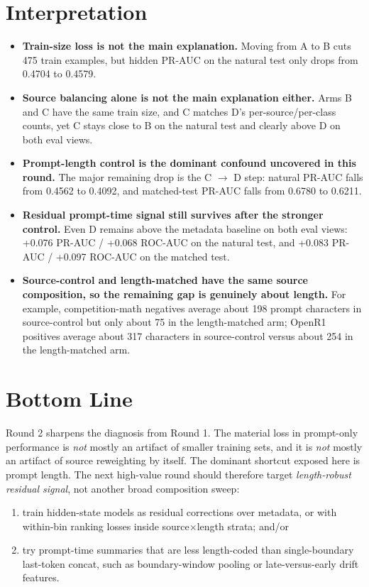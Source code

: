 \documentclass[11pt]{article}
\begin{document}
\section*{Interpretation}
\begin{itemize}
  \item \textbf{Train-size loss is not the main explanation.} Moving from A to B cuts 475 train examples, but hidden PR-AUC on the natural test only drops from 0.4704 to 0.4579.
  \item \textbf{Source balancing alone is not the main explanation either.} Arms B and C have the same train size, and C matches D's per-source/per-class counts, yet C stays close to B on the natural test and clearly above D on both eval views.
  \item \textbf{Prompt-length control is the dominant confound uncovered in this round.} The major remaining drop is the C $\rightarrow$ D step: natural PR-AUC falls from 0.4562 to 0.4092, and matched-test PR-AUC falls from 0.6780 to 0.6211.
  \item \textbf{Residual prompt-time signal still survives after the stronger control.} Even D remains above the metadata baseline on both eval views: +0.076 PR-AUC / +0.068 ROC-AUC on the natural test, and +0.083 PR-AUC / +0.097 ROC-AUC on the matched test.
  \item \textbf{Source-control and length-matched have the same source composition, so the remaining gap is genuinely about length.} For example, competition-math negatives average about 198 prompt characters in source-control but only about 75 in the length-matched arm; OpenR1 positives average about 317 characters in source-control versus about 254 in the length-matched arm.
\end{itemize}

\section*{Bottom Line}
Round 2 sharpens the diagnosis from Round 1. The material loss in prompt-only performance is \emph{not} mostly an artifact of smaller training sets, and it is \emph{not} mostly an artifact of source reweighting by itself. The dominant shortcut exposed here is prompt length. The next high-value round should therefore target \emph{length-robust residual signal}, not another broad composition sweep:
\begin{enumerate}
  \item train hidden-state models as residual corrections over metadata, or with within-bin ranking losses inside source$\times$length strata; and/or
  \item try prompt-time summaries that are less length-coded than single-boundary last-token concat, such as boundary-window pooling or late-versus-early drift features.
\end{enumerate}
\end{document}

